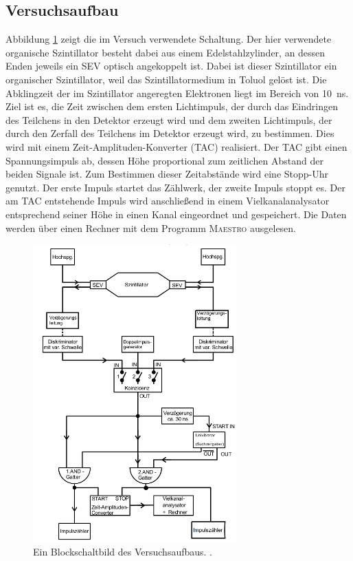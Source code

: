 \documentclass[
  bibliography=totoc,     %
  captions=tableheading,  %
  titlepage=firstiscover, %
]{scrartcl}
\begin{document}
  \subsection{Versuchsaufbau}
  \label{sec:Aufbau}
  	Abbildung \ref{fig:aufbau} zeigt die im Versuch verwendete Schaltung.
  	Der hier verwendete organische Szintillator besteht dabei aus einem
    Edelstahlzylinder, an dessen Enden jeweils ein SEV optisch angekoppelt ist.
    Dabei ist dieser Szintillator ein organischer Szintillator, weil das
    Szintillatormedium in Toluol gelöst ist. Die Abklingzeit der im Szintillator
    angeregten Elektronen liegt im Bereich von \SI{10}{\nano\second}.\\
  	Ziel ist es, die Zeit zwischen dem ersten Lichtimpuls, der durch das
    Eindringen des Teilchens in den Detektor erzeugt wird und dem zweiten
    Lichtimpuls, der durch den Zerfall des Teilchens im Detektor erzeugt wird,
    zu bestimmen. Dies wird mit einem Zeit-Amplituden-Konverter (TAC) realisiert.
    Der TAC gibt einen Spannungsimpuls ab, dessen Höhe proportional zum zeitlichen Abstand der
  	beiden Signale ist. Zum Bestimmen dieser Zeitabstände wird eine Stopp-Uhr genutzt.
    Der erste Impuls startet das Zählwerk, der zweite Impuls stoppt es.
    Der am TAC entstehende Impuls wird anschließend in einem Vielkanalanalysator
  	entsprechend seiner Höhe in einen Kanal eingeordnet und gespeichert.
  	Die Daten werden über einen Rechner mit dem Programm \textsc{Maestro} ausgelesen.
    \newpage
  	\begin{figure}[p]
    	\centering
    	\includegraphics[width=0.7\textwidth]{Bilder/AufbauB.png}
    	\caption{Ein Blockschaltbild des Versuchsaufbaus. \cite{anleitung}.}
    	\label{fig:aufbau}
  	\end{figure}
\end{document}
